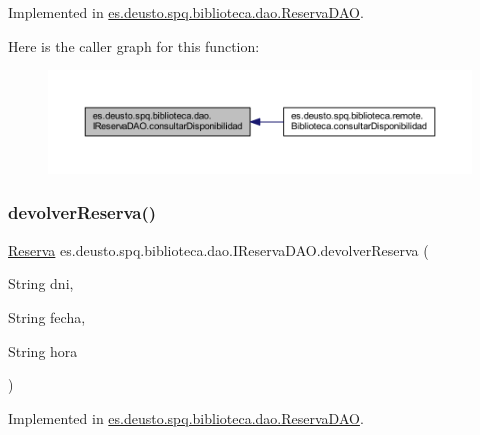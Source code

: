 Implemented in \mbox{\hyperlink{classes_1_1deusto_1_1spq_1_1biblioteca_1_1dao_1_1_reserva_d_a_o_a906df34a8711fd59536fc860bf3ef203}{es.\+deusto.\+spq.\+biblioteca.\+dao.\+Reserva\+D\+AO}}.

Here is the caller graph for this function\+:
\nopagebreak
\begin{figure}[H]
\begin{center}
\leavevmode
\includegraphics[width=350pt]{interfacees_1_1deusto_1_1spq_1_1biblioteca_1_1dao_1_1_i_reserva_d_a_o_a81c0cf35733fcd11e44e121d72098236_icgraph}
\end{center}
\end{figure}
\mbox{\label{interfacees_1_1deusto_1_1spq_1_1biblioteca_1_1dao_1_1_i_reserva_d_a_o_a5cd7d25bee6f31574e42d290a42cf856}} 
\subsubsection{\texorpdfstring{devolver\+Reserva()}{devolverReserva()}}
{\footnotesize\ttfamily \mbox{\hyperlink{classes_1_1deusto_1_1spq_1_1biblioteca_1_1data_1_1_reserva}{Reserva}} es.\+deusto.\+spq.\+biblioteca.\+dao.\+I\+Reserva\+D\+A\+O.\+devolver\+Reserva (\begin{DoxyParamCaption}\item[{String}]{dni,  }\item[{String}]{fecha,  }\item[{String}]{hora }\end{DoxyParamCaption})}



Implemented in \mbox{\hyperlink{classes_1_1deusto_1_1spq_1_1biblioteca_1_1dao_1_1_reserva_d_a_o_a84d61d9c1fbd0a2c7a17107354b6169e}{es.\+deusto.\+spq.\+biblioteca.\+dao.\+Reserva\+D\+AO}}.

